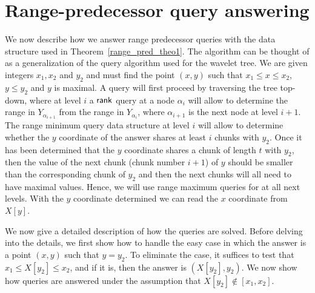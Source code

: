 \documentclass[11pt,runningheads]{llncs}
\def\rank{\mbox{\rm {\sf rank}}}
\begin{document}
\section{Range-predecessor query answering}
\label{sec:range_succ_queries}
We now describe how we answer range predecessor queries with the data structure
used in Theorem~\ref{range_pred_theo1}. The algorithm can be thought of as a generalization 
of the query algorithm used for the wavelet tree. 
We are given integers $x_1,x_2$ and $y_2$ and must find the point $(x,y)$
such that $x_1\leq x\leq x_2$, $y\leq y_2$ and $y$ is maximal. 
A query will first proceed by traversing the tree top-down, 
where at level $i$ a $\rank$ query at a node $\alpha_i$ will allow 
to determine the range in $Y_{\alpha_{i+1}}$ 
from the range in $Y_{\alpha_i}$, where $\alpha_{i+1}$ is the next node at level $i+1$. 
The range minimum query data structure at level $i$ will allow to determine 
whether the $y$ coordinate of the answer shares at least $i$ chunks with $y_2$. 
Once it has been determined that the $y$ coordinate shares a chunk of length 
$t$ with $y_2$, then the value of the next chunk (chunk number $i+1$) 
of $y$ should be smaller than the corresponding chunk of $y_2$ and then the next chunks 
will all need to have maximal values. Hence, we will use range maximum 
queries for at all next levels. With the $y$ coordinate determined
we can read the $x$ coordinate from $X[y]$. 

We now give a detailed description of how the queries are solved. 
Before delving into the details, we first show how to handle the easy case 
in which the answer is a point $(x,y)$ such that $y=y_2$. To eliminate 
the case, it suffices to test that $x_1\leq X[y_2]\leq x_2$, and if it is,
then the answer is $(X[y_2],y_2)$. We now show how 
queries are answered under the assumption that $X[y_2]\notin [x_1,x_2]$. 
\end{document}
